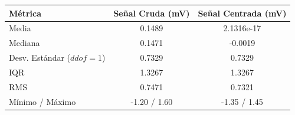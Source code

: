 \begin{tabular}{lcc}
\toprule
\textbf{Métrica} & \textbf{Señal Cruda (mV)} & \textbf{Señal Centrada (mV)} \\
\midrule
Media & 0.1489 & 2.1316e-17 \\
Mediana & 0.1471 & -0.0019 \\
Desv. Estándar ($ddof=1$) & 0.7329 & 0.7329 \\
IQR & 1.3267 & 1.3267 \\
RMS & 0.7471 & 0.7321 \\
Mínimo / Máximo & -1.20 / 1.60 & -1.35 / 1.45 \\
\bottomrule
\end{tabular}
